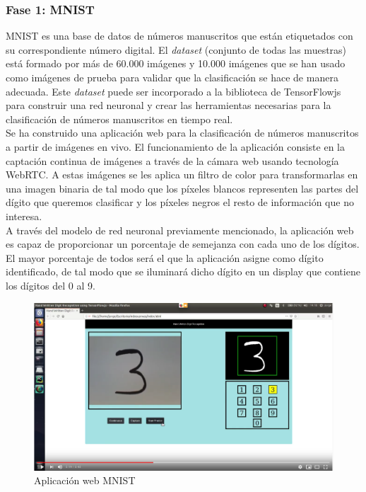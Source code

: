 \documentclass{report}
\begin{document}
\subsubsection{Fase 1: MNIST}
MNIST es una base de datos de números manuscritos que están etiquetados con su correspondiente número digital. El \textit{dataset} (conjunto de todas las muestras) está formado por más de 60.000 imágenes y 10.000 imágenes que se han usado como imágenes de prueba para validar que la clasificación se hace de manera adecuada. Este \textit{dataset} puede ser incorporado a la biblioteca de TensorFlowjs para construir una red neuronal y crear las herramientas necesarias para la clasificación de números manuscritos en tiempo real.
\\

Se ha construido una aplicación web para la clasificación de números manuscritos a partir de imágenes en vivo. El funcionamiento de la aplicación consiste en la captación continua de imágenes a través de la cámara web usando tecnología WebRTC. A estas imágenes se les aplica un filtro de color para transformarlas en una imagen binaria de tal modo que los píxeles blancos representen las partes  del dígito que queremos clasificar y los píxeles negros el resto de información que no interesa. 
\\

A través del modelo de red neuronal previamente mencionado, la aplicación web es capaz de proporcionar un porcentaje de semejanza con cada uno de los dígitos. El mayor porcentaje de todos será el que la aplicación asigne como dígito identificado, de tal modo que se iluminará dicho dígito en un display que contiene los dígitos del 0 al 9.

\renewcommand{\figurename}{Figura}		
\begin{figure}[h]
	\centering
	 \includegraphics[scale=0.12]{images/cap4/mnist.png}
	 \caption{Aplicación web MNIST}
\end{figure}
\end{document}
